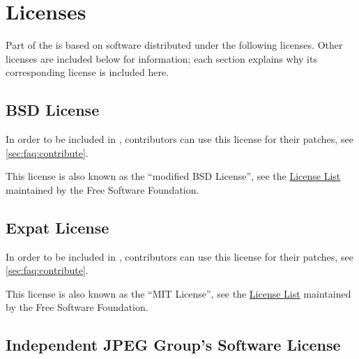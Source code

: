 
\chapter{Licenses}
\label{sec:licenses}

\newcommand{\inputLicense}[1]
{%
}

Part of the \usdk is based on software distributed under the following
licenses.  Other licenses are included below for information; each section
explains why its corresponding license is included here.


\section{BSD License}
\label{sec:license:bsd}
In order to be included in \usdk, contributors can use this license for
their patches, see \autoref{sec:faq:contribute}.

This license is also known as the ``modified BSD License'', see the
\href{http://www.gnu.org/licenses/license-list.html}{License List}
maintained by the Free Software Foundation.

\inputLicense{bsd}

\section{Expat License}
\label{sec:license:expat}
In order to be included in \usdk, contributors can use this license for
their patches, see \autoref{sec:faq:contribute}.

This license is also known as the ``MIT License'', see the
\href{http://www.gnu.org/licenses/license-list.html}{License List}
maintained by the Free Software Foundation.

\inputLicense{expat}

\section{Independent JPEG Group's Software License}

